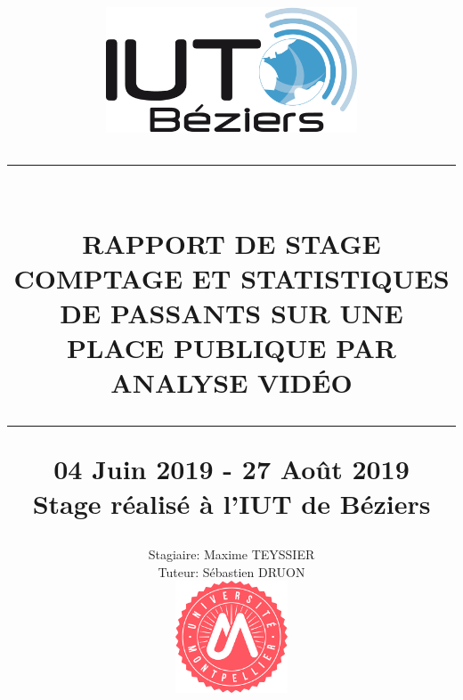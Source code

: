 \documentclass[12pt, french]{report}
\newcommand{\HRule}[1]{\rule{\linewidth}{#1}}
\begin{document}
\pagestyle{fancy}
\fancyhf{}
\setlength\headheight{15pt}


\title{\includegraphics[width=0.56\textwidth]{Images/IUT-Beziers.png}\\
		\normalsize\textsc{}
		\HRule{2pt} \\
        \LARGE \textbf{\uppercase{Rapport de stage\\Comptage et statistiques de passants sur une place publique par analyse vidéo}}
		\HRule{2pt} 
		\normalsize 04 Juin 2019 - 27 Août 2019 \vspace*{3\baselineskip}\\
	    \Large{\textbf{Stage réalisé à l'IUT de Béziers}}
        }
\author{Stagiaire: Maxime TEYSSIER\\Tuteur: Sébastien DRUON\\ 
        \includegraphics[width=0.25\textwidth]{Images/UM.png}
        \date{}\\
        }
\maketitle
\clearpage
\newpage
\strut
\thispagestyle{empty}
\newpage
\thispagestyle{empty}							      
\end{document}
